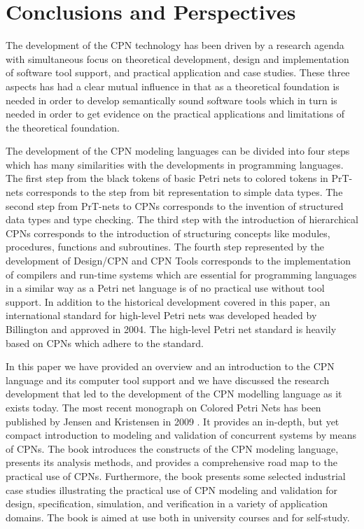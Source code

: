\section{Conclusions and Perspectives}

The development of the CPN technology has been driven by a research
agenda with simultaneous focus on theoretical development, design and
implementation of software tool support, and practical application and
case studies. These three aspects has had a clear mutual influence in
that as a theoretical foundation is needed in order to develop
semantically sound software tools which in turn is needed in order to
get evidence on the practical applications and limitations of the
theoretical foundation. 


The development of the CPN modeling languages can be divided into
four steps which has many similarities with the developments in
programming languages. The first step from the black tokens of basic
Petri nets to colored tokens in PrT-nets corresponds to the step from
bit representation to simple data types. The second step from PrT-nets
to CPNs corresponds to the invention of structured data types and type
checking. The third step with the introduction of hierarchical CPNs
corresponds to the introduction of structuring concepts like modules,
procedures, functions and subroutines. The fourth step represented by
the development of Design/CPN and CPN Tools corresponds to the
implementation of compilers and run-time systems which are essential
for programming languages in a similar way as a Petri net language is
of no practical use without tool support. In addition to the
historical development covered in this paper, an international
standard for high-level Petri nets was developed headed by Billington
\cite{hcpnstandard} and approved in 2004. The high-level Petri net
standard is heavily based on CPNs which adhere to the standard.

In this paper we have provided an overview and an introduction to the
CPN language and its computer tool support and we have discussed the
research development that led to the development of the CPN modelling
language as it exists today. The most recent monograph on Colored
Petri Nets has been published by Jensen and Kristensen in 2009
\cite{newcpnbook}. It provides an in-depth, but yet compact
introduction to modeling and validation of concurrent systems by means
of CPNs. The book introduces the constructs of the CPN modeling
language, presents its analysis methods, and provides a comprehensive
road map to the practical use of CPNs. Furthermore, the book presents
some selected industrial case studies illustrating the practical use
of CPN modeling and validation for design, specification, simulation,
and verification in a variety of application domains. The book is
aimed at use both in university courses and for self-study.

